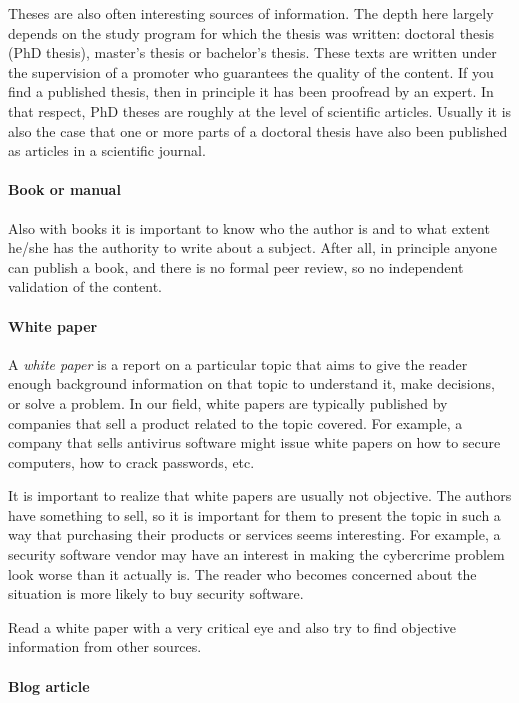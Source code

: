 Theses are also often interesting sources of information. The depth here largely depends on the study program for which the thesis was written: doctoral thesis (PhD thesis), master's thesis or bachelor's thesis. These texts are written under the supervision of a promoter who guarantees the quality of the content. If you find a published thesis, then in principle it has been proofread by an expert. In that respect, PhD theses are roughly at the level of scientific articles. Usually it is also the case that one or more parts of a doctoral thesis have also been published as articles in a scientific journal.

\paragraph{Book or manual}

Also with books it is important to know who the author is and to what extent he/she has the authority to write about a subject. After all, in principle anyone can publish a book, and there is no formal peer review, so no independent validation of the content.


\paragraph{White paper}

A \emph{white paper} is a report on a particular topic that aims to give the reader enough background information on that topic to understand it, make decisions, or solve a problem. In our field, white papers are typically published by companies that sell a product related to the topic covered. For example, a company that sells antivirus software might issue white papers on how to secure computers, how to crack passwords, etc.

It is important to realize that white papers are usually not objective. The authors have something to sell, so it is important for them to present the topic in such a way that purchasing their products or services seems interesting. For example, a security software vendor may have an interest in making the cybercrime problem look worse than it actually is. The reader who becomes concerned about the situation is more likely to buy security software.

Read a white paper with a very critical eye and also try to find objective information from other sources.

\paragraph{Blog article}


